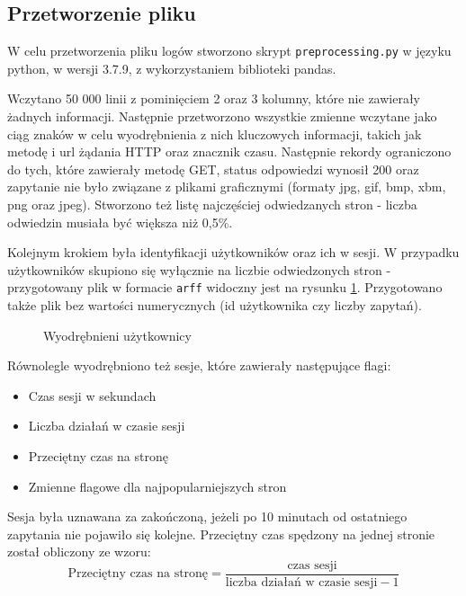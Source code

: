 \documentclass{classrep}
\begin{document}
    \subsection{Przetworzenie pliku}

    W celu przetworzenia pliku logów stworzono skrypt \verb|preprocessing.py| w języku python, w wersji 3.7.9, z wykorzystaniem biblioteki pandas.
    
    Wczytano 50 000 linii z pominięciem 2 oraz 3 kolumny, które nie zawierały żadnych informacji. Następnie przetworzono wszystkie zmienne wczytane jako ciąg znaków w celu wyodrębnienia z nich kluczowych informacji, takich jak metodę i url żądania HTTP oraz znacznik czasu. Następnie rekordy ograniczono do tych, które zawierały metodę GET, status odpowiedzi wynosił 200 oraz zapytanie nie było związane z plikami graficznymi (formaty jpg, gif, bmp, xbm, png oraz jpeg). Stworzono też listę najczęściej odwiedzanych stron - liczba odwiedzin musiała być większa niż 0,5\%.
    
    Kolejnym krokiem była identyfikacji użytkowników oraz ich w sesji. W przypadku użytkowników skupiono się wyłącznie na liczbie odwiedzonych stron - przygotowany plik w formacie \verb|arff| widoczny jest na rysunku \ref{fig:users_arff}. Przygotowano także plik bez wartości numerycznych (id użytkownika czy liczby zapytań).
    
    \begin{figure}[H] 
    	\begin{center}
    	\label{fig:users_arff}
        \caption{Wyodrębnieni użytkownicy}
    	\end{center}
    \end{figure}
    
    Równolegle wyodrębniono też sesje, które zawierały następujące flagi:
    
    \begin{itemize}
        \item Czas sesji w sekundach
        \item Liczba działań w czasie sesji
        \item Przeciętny czas na stronę
        \item Zmienne flagowe dla najpopularniejszych stron
    \end{itemize}
    
    Sesja była uznawana za zakończoną, jeżeli po 10 minutach od ostatniego zapytania nie pojawiło się kolejne. Przeciętny czas spędzony na jednej stronie został obliczony ze wzoru:
    \[ \text{Przeciętny czas na stronę} = \frac{\text{czas sesji}}{\text{liczba działań w czasie sesji} - 1} \]
    
\end{document}

